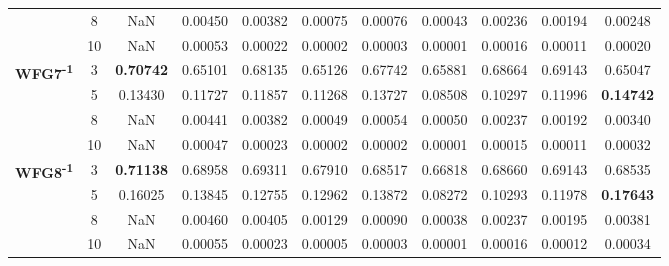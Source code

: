 \documentclass[conference]{IEEEtran}
\begin{document}
\begin{table*}[!htb]
\begin{tabular}{|c|c|c|c|c|c|c|c|c|c|c|}
	& 8          & NaN              & 0.00450           & 0.00382               & 0.00075          & 0.00076             & 0.00043             & 0.00236            & 0.00194              & 0.00248          \\ \cline{2-11} 
	& 10         & NaN              & 0.00053           & 0.00022               & 0.00002          & 0.00003             & 0.00001             & 0.00016            & 0.00011              & 0.00020          \\ \hline
	\multirow{4}{*}{\textbf{WFG7\textsuperscript{-1}}}  & 3          & \textbf{0.70742} & 0.65101           & 0.68135               & 0.65126          & 0.67742             & 0.65881             & 0.68664            & 0.69143              & 0.65047          \\ \cline{2-11} 
	& 5          & 0.13430          & 0.11727           & 0.11857               & 0.11268          & 0.13727             & 0.08508             & 0.10297            & 0.11996              & \textbf{0.14742} \\ \cline{2-11} 
	& 8          & NaN              & 0.00441           & 0.00382               & 0.00049          & 0.00054             & 0.00050             & 0.00237            & 0.00192              & 0.00340          \\ \cline{2-11} 
	& 10         & NaN              & 0.00047           & 0.00023               & 0.00002          & 0.00002             & 0.00001             & 0.00015            & 0.00011              & 0.00032          \\ \hline
	\multirow{4}{*}{\textbf{WFG8\textsuperscript{-1}}}  & 3          & \textbf{0.71138} & 0.68958           & 0.69311               & 0.67910          & 0.68517             & 0.66818             & 0.68660            & 0.69143              & 0.68535          \\ \cline{2-11} 
	& 5          & 0.16025          & 0.13845           & 0.12755               & 0.12962          & 0.13872             & 0.08272             & 0.10293            & 0.11978              & \textbf{0.17643} \\ \cline{2-11} 
	& 8          & NaN              & 0.00460           & 0.00405               & 0.00129          & 0.00090             & 0.00038             & 0.00237            & 0.00195              & 0.00381          \\ \cline{2-11} 
	& 10         & NaN              & 0.00055           & 0.00023               & 0.00005          & 0.00003             & 0.00001             & 0.00016            & 0.00012              & 0.00034          \\ \hline

\end{tabular}
\end{table*}
\end{document}
